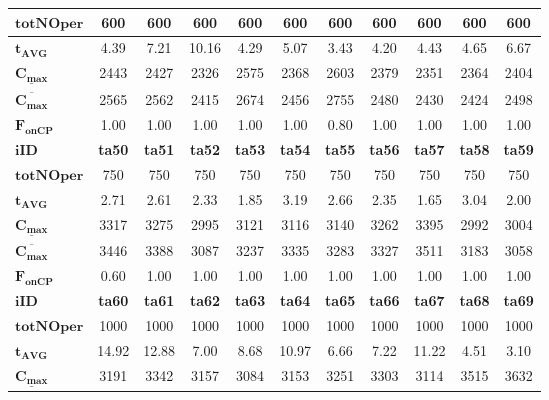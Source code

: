 \documentclass[archivemode]{mgr}
\begin{document}
\begin{table}[!ht]
\begin{tabularx}{\textwidth}{|X|c|c|c|c|c|c|c|c|c|c|}
\hline
$\mathbf{totNOper}$ & 600 & 600 & 600 & 600 & 600 & 600 & 600 & 600 & 600 & 600\\
\hline
$\mathbf{t_{AVG}}$ & 4.39 & 7.21 & 10.16 & 4.29 & 5.07 & 3.43 & 4.20 & 4.43 & 4.65 & 6.67\\
\hline
$\mathbf{\underline{C_{max}}}$ & 2443 & 2427 & 2326 & 2575 & 2368 & 2603 & 2379 & 2351 & 2364 & 2404\\
\hline
$\mathbf{\overline{C_{max}}}$ & 2565 & 2562 & 2415 & 2674 & 2456 & 2755 & 2480 & 2430 & 2424 & 2498\\
\hline
$\mathbf{F_{onCP}}$ & 1.00 & 1.00 & 1.00 & 1.00 & 1.00 & 0.80 & 1.00 & 1.00 & 1.00 & 1.00\\
\hline
\hline
$\mathbf{iID}$ & \textbf{ta50} & \textbf{ta51} & \textbf{ta52} & \textbf{ta53} & \textbf{ta54} & \textbf{ta55} & \textbf{ta56} & \textbf{ta57} & \textbf{ta58} & \textbf{ta59}\\
\hline
$\mathbf{totNOper}$ & 750 & 750 & 750 & 750 & 750 & 750 & 750 & 750 & 750 & 750\\
\hline
$\mathbf{t_{AVG}}$ & 2.71 & 2.61 & 2.33 & 1.85 & 3.19 & 2.66 & 2.35 & 1.65 & 3.04 & 2.00\\
\hline
$\mathbf{\underline{C_{max}}}$ & 3317 & 3275 & 2995 & 3121 & 3116 & 3140 & 3262 & 3395 & 2992 & 3004\\
\hline
$\mathbf{\overline{C_{max}}}$ & 3446 & 3388 & 3087 & 3237 & 3335 & 3283 & 3327 & 3511 & 3183 & 3058\\
\hline
$\mathbf{F_{onCP}}$ & 0.60 & 1.00 & 1.00 & 1.00 & 1.00 & 1.00 & 1.00 & 1.00 & 1.00 & 1.00\\
\hline
\hline
$\mathbf{iID}$ & \textbf{ta60} & \textbf{ta61} & \textbf{ta62} & \textbf{ta63} & \textbf{ta64} & \textbf{ta65} & \textbf{ta66} & \textbf{ta67} & \textbf{ta68} & \textbf{ta69}\\
\hline
$\mathbf{totNOper}$ & 1000 & 1000 & 1000 & 1000 & 1000 & 1000 & 1000 & 1000 & 1000 & 1000\\
\hline
$\mathbf{t_{AVG}}$ & 14.92 & 12.88 & 7.00 & 8.68 & 10.97 & 6.66 & 7.22 & 11.22 & 4.51 & 3.10\\
\hline
$\mathbf{\underline{C_{max}}}$ & 3191 & 3342 & 3157 & 3084 & 3153 & 3251 & 3303 & 3114 & 3515 & 3632\\

\end{tabularx}
\end{table}
\end{document}
